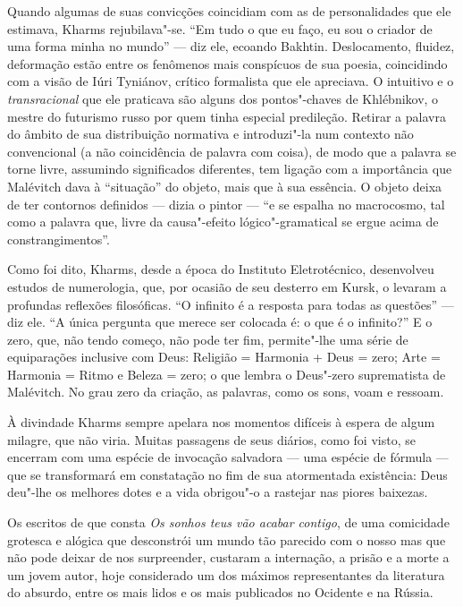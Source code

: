 Quando algumas de suas convicções coincidiam com as de personalidades
que ele estimava, Kharms rejubilava"-se. ``Em tudo o que eu faço, eu sou
o criador de uma forma minha no mundo'' --- diz ele, ecoando Bakhtin.
Deslocamento, fluidez, deformação estão entre os fenômenos mais
conspícuos de sua poesia, coincidindo com a visão de Iúri Tyniánov,
crítico formalista que ele apreciava. O intuitivo e o
\emph{transracional} que ele praticava são alguns dos pontos"-chaves de
Khlébnikov, o mestre do futurismo russo por quem tinha especial
predileção. Retirar a palavra do âmbito de sua distribuição normativa e
introduzi"-la num contexto não convencional (a não coincidência de
palavra com coisa), de modo que a palavra se torne livre, assumindo
significados diferentes, tem ligação com a importância que Malévitch
dava à ``situação'' do objeto, mais que à sua essência. O objeto deixa
de ter contornos definidos --- dizia o pintor --- ``e se espalha no
macrocosmo, tal como a palavra que, livre da causa"-efeito
lógico"-gramatical se ergue acima de constrangimentos''.

Como foi dito, Kharms, desde a época do Instituto Eletrotécnico,
desenvolveu estudos de numerologia, que, por ocasião de seu desterro em
Kursk, o levaram a profundas reflexões filosóficas. ``O infinito é a
resposta para todas as questões'' --- diz ele. ``A única pergunta que
merece ser colocada é: o que é o infinito?'' E o zero, que, não tendo
começo, não pode ter fim, permite"-lhe uma série de equiparações
inclusive com Deus: Religião = Harmonia + Deus = zero; Arte = Harmonia =
Ritmo e Beleza = zero; o que lembra o Deus"-zero suprematista de
Malévitch. No grau zero da criação, as palavras, como os sons, voam e
ressoam.

À divindade Kharms sempre apelara nos momentos difíceis à espera de
algum milagre, que não viria. Muitas passagens de seus diários, como foi
visto, se encerram com uma espécie de invocação salvadora --- uma espécie
de fórmula --- que se transformará em constatação no fim de sua
atormentada existência: Deus deu"-lhe os melhores dotes e a vida
obrigou"-o a rastejar nas piores baixezas.

Os escritos de que consta \emph{Os sonhos teus vão acabar contigo}, de uma comicidade grotesca e
alógica que desconstrói um mundo tão parecido com o nosso mas que não
pode deixar de nos surpreender, custaram a internação, a prisão e a
morte a um jovem autor, hoje considerado um dos máximos representantes
da literatura do absurdo, entre os mais lidos e os mais publicados no
Ocidente e na Rússia.



